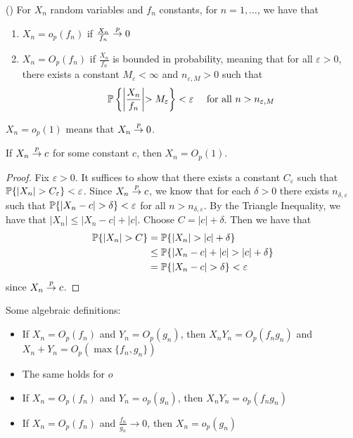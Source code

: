 \documentclass[10pt]{article}
\begin{document}
\begin{definition}
	() For $X_n$ random variables and $f_n$ constants, for $n = 1,\dots$, we have that
	\begin{enumerate}
		\item $X_n = o_p(f_n)$ if $\frac{X_n}{f_n} \overset{p}{\to} 0$
		\item $X_n = O_p(f_n)$ if $\frac{X_n}{f_n}$ is bounded in probability, meaning that for all $\varepsilon > 0$, there exists a constant $M_\varepsilon < \infty$ and $n_{\varepsilon,M} > 0$ such that
		\[
		\mathbb{P} \left\{ \middle| \frac{X_n}{f_n} \middle| > M_\varepsilon \right\} < \varepsilon \quad \text{ for all } n > n_{\varepsilon,M}
		\]
	\end{enumerate}
\end{definition}
\begin{remark}
	$X_n = o_p(1)$ means that $X_n \overset{p}{\to} 0$.
\end{remark}

\begin{theorem}
	If $X_n \overset{p}{\to} c$ for some constant $c$, then $X_n = O_p(1)$.
\end{theorem}
\begin{proof}
	Fix $\varepsilon > 0$. It suffices to show that there exists a constant $C_\varepsilon$ such that $\mathbb{P} \{|X_n| > C_\varepsilon\} < \varepsilon$. Since $X_n \overset{p}{\to} c$, we know that for each $\delta > 0$ there exists $n_{\delta,\varepsilon}$ such that $\mathbb{P}\{|X_n - c| > \delta\} < \varepsilon$ for all $n > n_{\delta,\varepsilon}$. By the Triangle Inequality, we have that $|X_n| \le |X_n - c| + |c|$. Choose $C = |c| + \delta$. Then we have that
	\begin{align*}
		\mathbb{P}\{|X_n| > C\} &= \mathbb{P}\{|X_n| > |c|+\delta\} \\
		&\le \mathbb{P}\{|X_n - c| + |c| > |c|+\delta\} \\
		&= \mathbb{P}\{|X_n - c| > \delta\} < \varepsilon
	\end{align*}
	since $X_n \overset{p}{\to} c$.
\end{proof}

\begin{definition}
	Some algebraic definitions:
	\begin{itemize}
		\item If $X_n = O_p(f_n)$ and $Y_n = O_p(g_n)$, then $X_nY_n = O_p(f_ng_n)$ and $X_n + Y_n = O_p(\max\{f_n,g_n\})$
		\item The same holds for $o$
		\item If $X_n = O_p(f_n)$ and $Y_n = o_p(g_n)$, then $X_nY_n = o_p(f_ng_n)$
		\item If $X_n = O_p(f_n)$ and $\frac{f_n}{g_n} \to 0$, then $X_n = o_p(g_n)$
	\end{itemize}
\end{definition}
\end{document}
